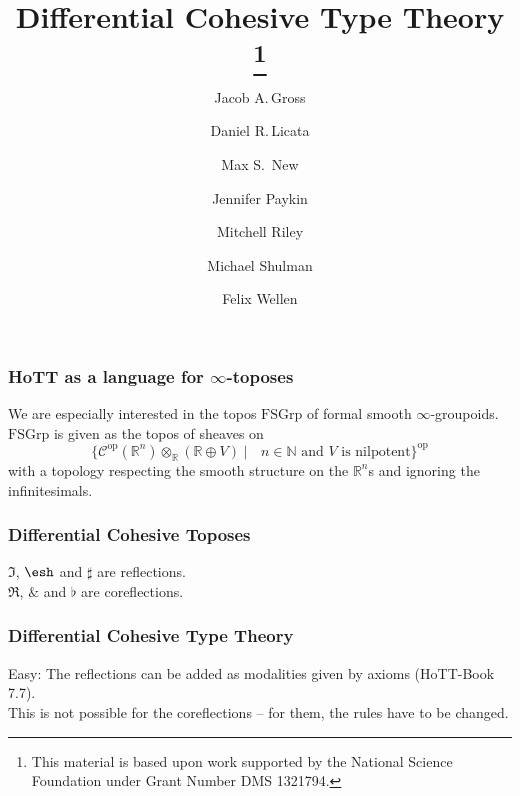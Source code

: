 \documentclass{beamer}
\title{Differential Cohesive Type Theory \thanks{This
    material is based upon work supported by the National Science Foundation
    under Grant Number DMS 1321794.}}
\author{Jacob A.\,Gross}
\affil[1]{University of Pittsburgh}
\author[2]{Daniel R.\,Licata}
\affil[2]{Wesleyan University}
\author[3]{Max S.\, New}
\affil[3]{Northeastern University}
\author[4]{Jennifer Paykin}
\affil[4]{University of Pennsylvania}
\author[2]{Mitchell Riley}
\author[5]{Michael Shulman}
\affil[5]{University of San Diego}
\author[6]{Felix Wellen}
\affil[6]{Karlsruhe Institute of Technology}
\date{}
\newcommand{\Red}{\Re}
\newcommand{\Cored}{\Im}
\newcommand{\Wat}{\&}
\newcommand{\shape}{\ensuremath{\mathord{\raisebox{0.5pt}{\text{\rm\esh}}}}}
\newcommand{\submodality}{\rotatebox[origin=c]{90}{$\subset$}}
\newcommand{\op}{\mathrm{op}}
\newcommand{\R}{\mathbb{R}}
\newcommand{\nat}{\mathbb{N}}
\begin{document}
\begin{frame}
  \titlepage
\end{frame}

\begin{frame}
  \frametitle{HoTT as a language for $\infty$-toposes}
  We are especially interested in the topos $\mathrm{FSGrp}$ of
  formal smooth $\infty$-groupoids. \\
  $\mathrm{FSGrp}$ is given as the topos of sheaves on 
  \[ \{\mathcal C^\op(\R^n)\otimes_\R (\R\oplus V)\mid \text{ $n\in\nat$ and $V$ is nilpotent}\}^\op \]
  with a topology respecting the smooth structure on the $\R^n$s and ignoring the infinitesimals.
\end{frame}

\begin{frame}
  \frametitle{Differential Cohesive Toposes}
  $\Cored$, $\shape$ and $\sharp$ are reflections. \\
  $\Red$, $\Wat$ and $\flat$ are coreflections.
\end{frame}

\begin{frame}
  \frametitle{Differential Cohesive Type Theory}
  Easy: The reflections can be added as modalities given by axioms (HoTT-Book 7.7). \\
  This is not possible for the coreflections -- for them, the rules have to be changed.
\end{frame}
\end{document}
